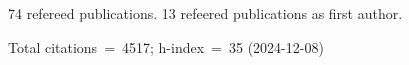 74 refereed publications. 13 refeered publications as first author.

Total citations~=~4517; h-index~=~35 (2024-12-08)